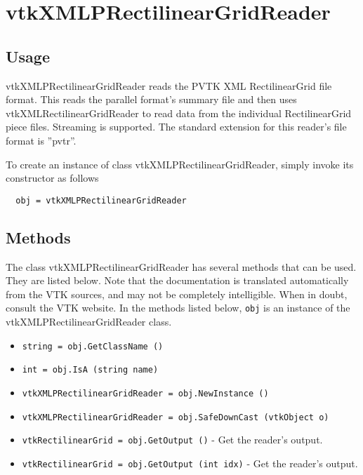 \section{vtkXMLPRectilinearGridReader}

\subsection{Usage}

 vtkXMLPRectilinearGridReader reads the PVTK XML RectilinearGrid
 file format.  This reads the parallel format's summary file and
 then uses vtkXMLRectilinearGridReader to read data from the
 individual RectilinearGrid piece files.  Streaming is supported.
 The standard extension for this reader's file format is ''pvtr''.

To create an instance of class vtkXMLPRectilinearGridReader, simply
invoke its constructor as follows
\begin{verbatim}
  obj = vtkXMLPRectilinearGridReader
\end{verbatim}
\subsection{Methods}

The class vtkXMLPRectilinearGridReader has several methods that can be used.
  They are listed below.
Note that the documentation is translated automatically from the VTK sources,
and may not be completely intelligible.  When in doubt, consult the VTK website.
In the methods listed below, \verb|obj| is an instance of the vtkXMLPRectilinearGridReader class.
\begin{itemize}
\item  \verb|string = obj.GetClassName ()|

\item  \verb|int = obj.IsA (string name)|

\item  \verb|vtkXMLPRectilinearGridReader = obj.NewInstance ()|

\item  \verb|vtkXMLPRectilinearGridReader = obj.SafeDownCast (vtkObject o)|

\item  \verb|vtkRectilinearGrid = obj.GetOutput ()| -  Get the reader's output.

\item  \verb|vtkRectilinearGrid = obj.GetOutput (int idx)| -  Get the reader's output.

\end{itemize}
